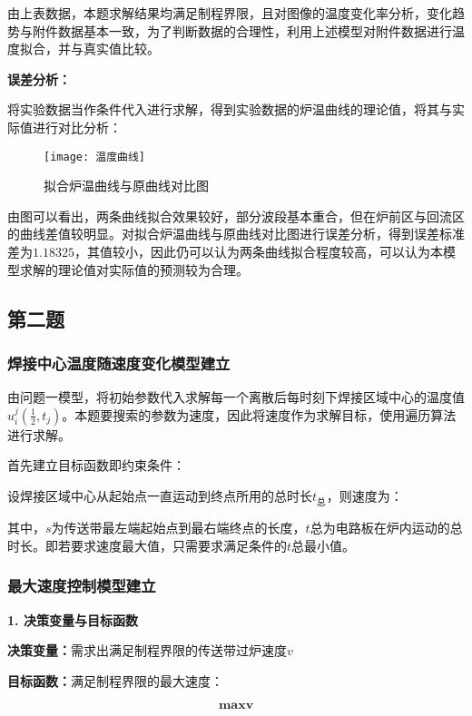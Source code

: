 \documentclass[withoutpreface,bwprint]{cumcmthesis} %
\numberwithin{equation}{subsection}
\newcommand{\toper}{\noindent \textbf}
\begin{document}
由上表数据，本题求解结果均满足制程界限，且对图像的温度变化率分析，变化趋势与附件数据基本一致，为了判断数据的合理性，利用上述模型对附件数据进行温度拟合，并与真实值比较。

\toper{误差分析：}

将实验数据当作条件代入进行求解，得到实验数据的炉温曲线的理论值，将其与实际值进行对比分析：

\begin{figure}[!h]
	\centering
	\texttt{[image: 温度曲线]}
	\caption{拟合炉温曲线与原曲线对比图}
	\label{fig:quxian}
\end{figure}

由图可以看出，两条曲线拟合效果较好，部分波段基本重合，但在炉前区与回流区的曲线差值较明显。对拟合炉温曲线与原曲线对比图进行误差分析，得到误差标准差为$1.18325$，其值较小，因此仍可以认为两条曲线拟合程度较高，可以认为本模型求解的理论值对实际值的预测较为合理。
\subsection{\quad 第二题}

\subsubsection{焊接中心温度随速度变化模型建立}

由问题一模型，将初始参数代入求解每一个离散后每时刻下焊接区域中心的温度值$u_{i}^j(\frac{1}{2},t_{j})$。本题要搜索的参数为速度，因此将速度作为求解目标，使用遍历算法进行求解。

首先建立目标函数即约束条件：

设焊接区域中心从起始点一直运动到终点所用的总时长$t_{\text{总}}$，则速度为：

其中，$s$为传送带最左端起始点到最右端终点的长度，$t$总为电路板在炉内运动的总时长。即若要求速度最大值，只需要求满足条件的$t$总最小值。

\subsubsection{最大速度控制模型建立}

\toper{1. 决策变量与目标函数}

\toper{决策变量：}需求出满足制程界限的传送带过炉速度$v$

\toper{目标函数：}满足制程界限的最大速度：

\begin{equation}
	\bm{maxv}
\end{equation}
\end{document}
